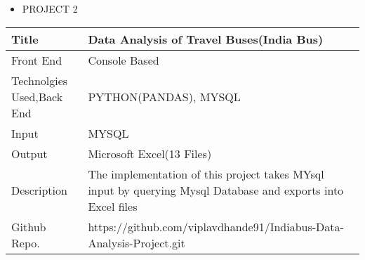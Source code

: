 \documentclass[a4paper,10pt]{article}
\begin{document}
 
 
 
\vspace{10mm}

 
 \renewcommand{\labelitemi}{$\blacksquare$}
 
 
 \begin{itemize}
   \item {\large PROJECT 2}
   
 \end{itemize}


\begin{tabu} to 0.9\textwidth { | X[l] | X[2.5] | }
 \hline
 \large Title & Data Analysis of Travel Buses(India Bus)\\
 
 \hline
\large Front End  & Console Based\\
 

 \hline
 \large Technolgies Used,Back End    & PYTHON(PANDAS), MYSQL \\
 
 \hline
\large Input  & MYSQL   \\


\hline
\large Output  & Microsoft Excel(13 Files)   \\
 
 \hline
\large Description & The implementation of this project takes MYsql input by querying Mysql Database and exports into Excel files \\


\hline
\large Github Repo. & https://github.com/viplavdhande91/Indiabus-Data-Analysis-Project.git \\
 
 
\hline
 

 
\hline
\end{tabu}
 
 
 
 
 
 
 
 
 
 
 
 
 
 
 
 
 
 
 
 
 
 
 
 
 
 
 
 
 
 
 
\end{document}

